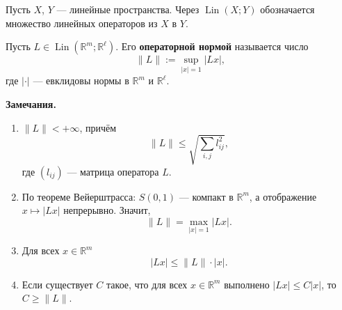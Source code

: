 \label{definition:01}

\begin{definition}
Пусть $X$, $Y$ --- линейные пространства.
Через $\operatorname{Lin}(X;Y)$ обозначается множество линейных операторов из $X$ в $Y$.

Пусть $L\in\operatorname{Lin}(\mathbb R^m;\mathbb R^\ell)$.
Его \textbf{операторной нормой} называется число
\[
  \|L\|:=\sup_{|x|=1}|Lx|,
\]
где $|\cdot|$ --- евклидовы нормы в $\mathbb R^m$ и $\mathbb R^\ell$.
\end{definition}

\textbf{Замечания.}
\begin{enumerate}
  \item
    $\|L\|<+\infty$, причём
    \[
      \|L\|\le\sqrt{\sum_{i,j}l_{ij}^2},
    \]
    где $(l_{ij})$ --- матрица оператора $L$.

  \item
    По теореме Вейерштрасса: $S(0,1)$ --- компакт в $\mathbb R^m$,
    а отображение $x\mapsto|Lx|$ непрерывно.
    Значит,
    \[
      \|L\|=\max_{|x|=1}|Lx|.
    \]

  \item
    Для всех $x\in\mathbb R^m$
    \[
      |Lx|\le\|L\|\cdot|x|.
    \]

  \item
    Если существует $C$ такое, что для всех $x\in\mathbb R^m$
    выполнено $|Lx|\le C|x|$, то $C\ge\|L\|$.
\end{enumerate}
